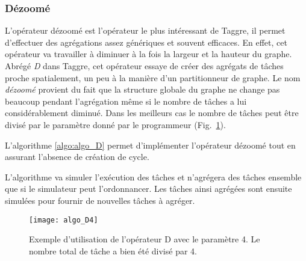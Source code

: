 \subsubsection{Dézoomé}
L'opérateur dézoomé est l'opérateur le plus intéressant de Taggre, il permet d'effectuer des agrégations assez génériques et souvent efficaces.
%
En effet, cet opérateur va travailler à diminuer à la fois la largeur et la hauteur du graphe.
%
Abrégé {\em D} dans Taggre, cet opérateur essaye de créer des agrégats de tâches proche spatialement, un peu à la manière d'un partitionneur de graphe.
%
Le nom {\em dézoomé} provient du fait que la structure globale du graphe ne change pas beaucoup pendant l'agrégation même si le nombre de tâches a lui considérablement diminué.
%
Dans les meilleurs cas le nombre de tâches peut être divisé par le paramètre donné par le programmeur (Fig.~\ref{fig:algo_D4}).


L'algorithme \ref{algo:algo_D} permet d'implémenter l'opérateur dézoomé tout en assurant l'absence de création de cycle.
%

L'algorithme va simuler l'exécution des tâches et n'agrégera des tâches ensemble que si le simulateur peut l'ordonnancer.
%
Les tâches ainsi agrégées sont ensuite simulées pour fournir de nouvelles tâches à agréger.



\begin{figure}[t!]
  \centering
  \texttt{[image: algo\_D4]}
  \caption{Exemple d'utilisation de l'opérateur D avec le paramètre 4. Le nombre total de tâche a bien été divisé par 4.}
  \label{fig:algo_D4}
\end{figure}

